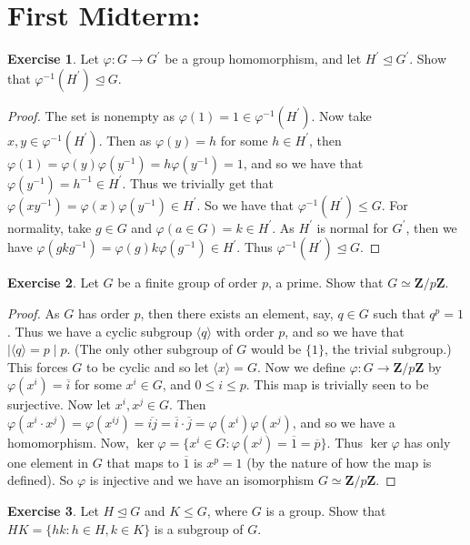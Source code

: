 \documentclass[9pt,reqno]{amsart}
\theoremstyle{definition}
\newtheorem{exercise}{Exercise}[section]
\newcommand{\zz}{\mathbf Z}
\newcommand{\pp}{\prime}
\begin{document}
\section{First Midterm:}
\begin{exercise} Let $\varphi \colon G \to G^\pp$ be a group homomorphism, and let $H^\pp \trianglelefteq G^\pp $. Show that $\varphi^{-1} (H^\pp) \trianglelefteq G$. 
\end{exercise}
\begin{proof}
The set is nonempty as $\varphi (1) =1 \in \varphi^{-1} (H^\pp)$.  Now take $x, y \in \varphi^{-1} (H^\pp)$. Then as $\varphi (y) = h$ for some $h \in H^\pp$, then $\varphi (1) = \varphi(y) \varphi(y^{-1}) =h \varphi(y^{-1} )=  1$, and so we have that $\varphi(y^{-1}) = h^{-1} \in H^\pp$. Thus we trivially get that $\varphi (xy^{-1}) = \varphi (x) \varphi(y^{-1}) \in H^\pp$. So we have that $\varphi^{-1} (H^\pp) \leq G$. For normality, take $g \in G$ and $\varphi(a \in G) = k \in H^\pp$. As $H^\pp$ is normal for $G^\pp$,  then we have $\varphi (gkg^{-1} ) = \varphi (g) k \varphi(g^{-1}) \in H^\pp$. Thus $\varphi^{-1} (H^\pp) \trianglelefteq G$. 
\end{proof}
\begin{exercise}
	Let $G$ be a finite group of order $p$, a prime. Show that $G \simeq \zz/ p \zz$.
\end{exercise}
\begin{proof}
	As $G$ has order $p$, then there exists an element, say, $q \in G$ such that $q^p = 1$. Thus we have a cyclic subgroup $ \langle q \rangle $ with order $p$, and so we have that $ | \langle q \rangle = p \mid p$. (The only other subgroup of $G$ would be $ \{ 1 \}$, the trivial subgroup.) This forces $G$ to be cyclic and so let $\langle x \rangle = G$. Now we define $\varphi \colon G \to \zz / p \zz$ by $\varphi (x^i) = \overline{i}$ for some $x^i \in G$, and $0 \leq i \leq p$. This map is trivially seen to be surjective. Now let $x^i, x^j \in G$. Then $\varphi (x^i \cdot x^j) = \varphi(x^{ij}) = \overline{ij} = \overline{i} \cdot  \overline{j} = \varphi (x^i) \varphi(x^j)$, and so we have a homomorphism. Now, $\ker \varphi = \{ x^i \in G \colon \varphi(x^j) = \overline{1} = \overline{p} \}$. Thus $\ker \varphi$ has only one element in $G$ that maps to $\overline{1}$ is $x^p = 1$ (by the nature of how the map is defined). So $\varphi$ is injective and we have an isomorphism $ G \simeq \zz / p \zz$. 
\end{proof}
\begin{exercise}
	Let $H \trianglelefteq G$ and $K \leq G$, where $G$ is a group. Show that $HK = \{ hk \colon h \in H, k \in K \}$ is a subgroup of $G$. 
\end{exercise}
\end{document}
